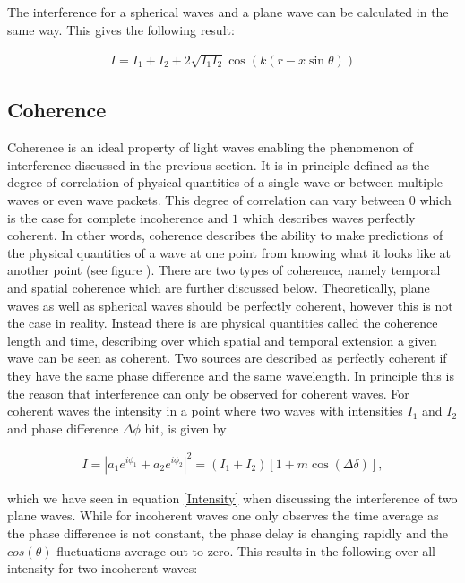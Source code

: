
The interference for a spherical waves and a plane wave can be calculated in the same way. This gives the following result:

\begin{align}
I=I_1+I_2+2\sqrt{I_1I_2}\cos(k(r-x\sin\theta))
\end{align}



\subsection{Coherence \label{Coherence section}}

Coherence is an ideal property of light waves enabling the phenomenon of interference discussed in the previous section. It is in principle defined as the degree of correlation of physical quantities of a single wave or between multiple waves or even wave packets. This degree of correlation can vary between $0$ which is the case for complete incoherence and $1$ which describes waves perfectly coherent. In other words, coherence describes the ability to make predictions of the physical quantities of a wave at one point from knowing what it looks like at another point (see figure ). There are two types of coherence, namely temporal and spatial coherence which are further discussed below. Theoretically, plane waves as well as spherical waves should be perfectly coherent, however this is not the case in reality. Instead there is are physical quantities called the coherence length and time, describing over which spatial and temporal extension a given wave can be seen as coherent. Two sources are described as perfectly coherent if they have the same phase difference and the same wavelength. In principle this is the reason that interference can only be observed for coherent waves. For coherent waves the intensity in a point where two waves with intensities $I_1$ and $I_2$ and phase difference $\Delta \phi$ hit, is given by

\begin{align}
I=\left| a_1 e^{i \phi_1} + a_2 e^{i \phi_2} \right|^2 = \left(I_1+I_2 \right) \left[ 1 + m \cos(\Delta \delta)\right], 
\end{align}

which we have seen in equation \ref{Intensity} when discussing the interference of two plane waves.
While for incoherent waves one only observes the time average as the phase difference is not constant, the phase delay is changing rapidly and the $cos(\theta)$ fluctuations average out to zero. This results in the following over all intensity for two incoherent waves:

